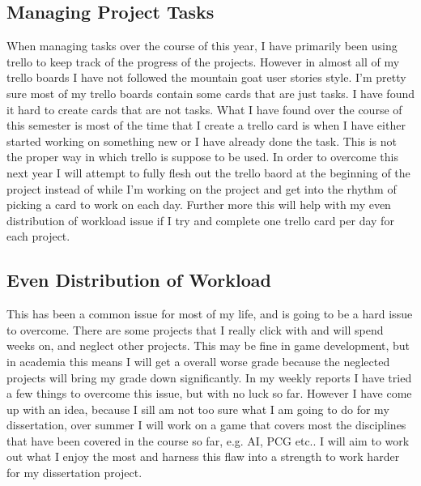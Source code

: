 \documentclass{scrartcl}
\begin{document}
\subsection{Managing Project Tasks}
When managing tasks over the course of this year, I have primarily been using trello to keep track of the progress of the projects. However in almost all of my trello boards I have not followed the mountain goat user stories style. I'm pretty sure most of my trello boards contain some cards that are just tasks. I have found it hard to create cards that are not tasks. What I have found over the course of this semester is most of the time that I create a trello card is when I have either started working on something new or I have already done the task. This is not the proper way in which trello is suppose to be used.
In order to overcome this next year I will attempt to fully flesh out the trello baord at the beginning of the project instead of while I'm working on the project and get into the rhythm of picking a card to work on each day. Further more this will help with my even distribution of workload issue if I try and complete one trello card per day for each project.

\subsection{Even Distribution of Workload}
This has been a common issue for most of my life, and is going to be a hard issue to overcome. There are some projects that I really click with and will spend weeks on, and neglect other projects. This may be fine in game development, but in academia this means I will get a overall worse grade because the neglected projects will bring my grade down significantly.
In my weekly reports I have tried a few things to overcome this issue, but with no luck so far. However I have come up with an idea, because I sill am not too sure what I am going to do for my dissertation, over summer I will work on a game that covers most the disciplines that have been covered in the course so far, e.g. AI, PCG etc.. I will aim to work out what I enjoy the most and harness this flaw into a strength to work harder for my dissertation project.

\end{document}
